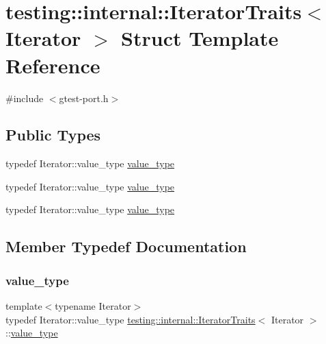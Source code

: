 \hypertarget{structtesting_1_1internal_1_1_iterator_traits}{}\section{testing\+::internal\+::Iterator\+Traits$<$ Iterator $>$ Struct Template Reference}
\label{structtesting_1_1internal_1_1_iterator_traits}


{\ttfamily \#include $<$gtest-\/port.\+h$>$}

\subsection*{Public Types}
\begin{DoxyCompactItemize}
\item 
typedef Iterator\+::value\+\_\+type \mbox{\hyperlink{structtesting_1_1internal_1_1_iterator_traits_a29de4320a9c53ce438d3561b94e515bb}{value\+\_\+type}}
\item 
typedef Iterator\+::value\+\_\+type \mbox{\hyperlink{structtesting_1_1internal_1_1_iterator_traits_a29de4320a9c53ce438d3561b94e515bb}{value\+\_\+type}}
\item 
typedef Iterator\+::value\+\_\+type \mbox{\hyperlink{structtesting_1_1internal_1_1_iterator_traits_a29de4320a9c53ce438d3561b94e515bb}{value\+\_\+type}}
\end{DoxyCompactItemize}


\subsection{Member Typedef Documentation}
\mbox{\label{structtesting_1_1internal_1_1_iterator_traits_a29de4320a9c53ce438d3561b94e515bb}} 
\subsubsection{\texorpdfstring{value\_type}{value\_type}\hspace{0.1cm}{\footnotesize\ttfamily [1/3]}}
{\footnotesize\ttfamily template$<$typename Iterator$>$ \\
typedef Iterator\+::value\+\_\+type \mbox{\hyperlink{structtesting_1_1internal_1_1_iterator_traits}{testing\+::internal\+::\+Iterator\+Traits}}$<$ Iterator $>$\+::\mbox{\hyperlink{structtesting_1_1internal_1_1_iterator_traits_a29de4320a9c53ce438d3561b94e515bb}{value\+\_\+type}}}

